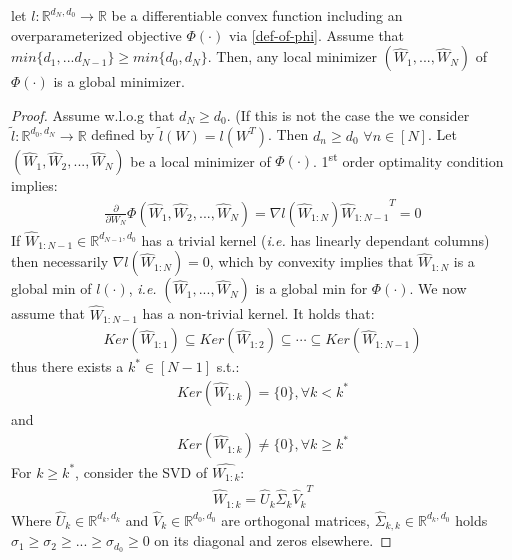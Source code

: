 \documentclass[12pt]{article}
\newcommand{\ie}{{\it i.e. }}
\begin{document}
	\begin{theorem}
	let $l:\mathbb{R}^{d_N, d_0}\to\mathbb{R}$ be a differentiable convex function including an overparameterized objective $\Phi(\cdot)$ via \eqref{def-of-phi}. 
	Assume that $min\{d_1,...d_{N-1}\} \geq min\{d_0, d_N\}$. Then, any local minimizer $({\widehat{W}_1},..., {\widehat{W}_N})$ of $\Phi(\cdot)$ is a global minimizer.
	\end{theorem}
	\begin{proof}
	    Assume w.l.o.g that $d_N \geq d_0$. (If this is not the case the we consider $\tilde{l}:\mathbb{R}^{d_0,d_N} \to \mathbb{R}$ defined by $\tilde{l}(W) = l(W^T)$. Then $d_n \geq d_0$ $\forall n \in [N]$. Let $({\widehat{W}_1}, {\widehat{W}_2}, ... , {\widehat{W}_N})$ be a local minimizer of $\Phi(\cdot)$. 1\textsuperscript{st} order optimality condition implies:
	    \begin{align*}
	        \frac{\partial}{\partial W_N}\Phi({\widehat{W}_1}, {\widehat{W}_2}, ..., {\widehat{W}_N}) = \nabla{l({{\widehat{W}}_{1:N}})}{{\widehat{W}_{1:N-1}}}^T = 0
	    \end{align*}
	    If ${{\widehat{W}_{1:N-1}}} \in \mathbb{R}^{d_{N-1}, d_0}$ has a trivial kernel (\ie has linearly dependant columns) then necessarily $\nabla{l({{\widehat{W}_{1:N}}})} = 0$, which by convexity implies that ${{\widehat{W}_{1:N}}}$ is a global min of $l(\cdot)$, \ie $({\widehat{W}_1},..., {\widehat{W}_N})$ is a global min for $\Phi(\cdot)$.
	    We now assume that ${{\widehat{W}_{1:N-1}}}$ has a non-trivial kernel. It holds that:
	    \begin{align*}
	        Ker({{\widehat{W}_{1:1}}}) \subseteq Ker({{\widehat{W}_{1:2}}}) \subseteq \cdots \subseteq Ker({{\widehat{W}_{1:N-1}}})
	    \end{align*}
	    thus there exists a $k^\ast \in [N-1]$ s.t.:
	    \begin{align*}
	        Ker({{\widehat{W}_{1:k}}}) = \{0\}, \forall k<k^\ast
        \end{align*}
        and
        \begin{align*}
	        Ker({{\widehat{W}_{1:k}}}) \neq \{0\}, \forall k \geq k^\ast
	    \end{align*}
	    \newpage
	    For $k \geq k^\ast$, consider the SVD of $\widehat{W_{1:k}}$:
	    \begin{align*}
	        {{\widehat{W}_{1:k}}} = {\widehat{U}_k}{\widehat{\Sigma}_k}{\widehat{V}_k}^T
	    \end{align*}
	    Where ${\widehat{U}_k} \in \mathbb{R}^{d_k, d_k}$ and ${\widehat{V}_k} \in \mathbb{R}^{d_0,d_0}$ are orthogonal matrices, ${\widehat{\Sigma}_{k,k}} \in \mathbb{R}^{d_k, d_0}$ holds $\sigma_1 \geq \sigma_2 \geq ... \geq \sigma_{d_0} \geq 0$ on its diagonal and zeros elsewhere.

\end{proof}
\end{document}
